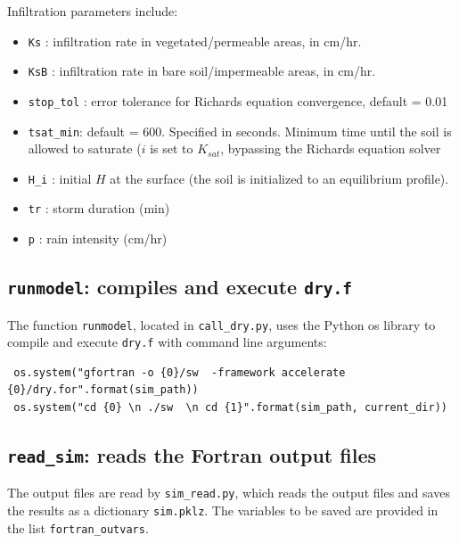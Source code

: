 \documentclass{article}
\newcommand{\code}[1]{\texttt{#1}}
\begin{document}
Infiltration parameters include:
\begin{itemize}
	\item \code{Ks} : infiltration rate in vegetated/permeable areas, in cm/hr.  
	\item \code{KsB} : infiltration rate in bare soil/impermeable areas, in cm/hr.
	
	\item \code{stop\_tol} : error tolerance for Richards equation convergence,	default = 0.01

	\item \code{tsat\_min}: default = 600.  Specified in seconds.  Minimum time until the soil is allowed to saturate ($i$ is set to $K_{sat}$, bypassing the Richards equation solver
	\item \code{H\_i} : initial $H$ at the surface (the soil is initialized to an equilibrium profile).

	\item \code{tr} : storm duration (min)
	\item \code{p} : rain intensity (cm/hr)
\end{itemize}


\subsection{\code{runmodel}: compiles and execute \code{dry.f}}
The function \code{runmodel}, located in \code{call\_dry.py}, uses the Python os library to compile and execute \code{dry.f} with command line arguments: 

\begin{verbatim}
 os.system("gfortran -o {0}/sw  -framework accelerate {0}/dry.for".format(sim_path))
 os.system("cd {0} \n ./sw  \n cd {1}".format(sim_path, current_dir))	
\end{verbatim}

    
\subsection{\code{read\_sim}: reads the Fortran output files }

The output files are read by \code{sim\_read.py}, which reads the output files and saves the results as a dictionary  \code{sim.pklz}.  The variables to be saved are provided in the list \code{fortran\_outvars}.
\end{document}
